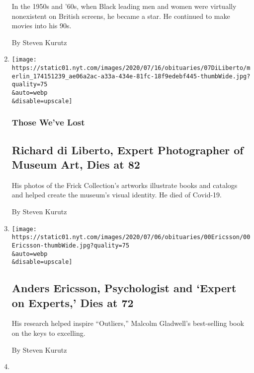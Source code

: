 \begin{enumerate}
  In the 1950s and '60s, when Black leading men and women were virtually
  nonexistent on British screens, he became a star. He continued to make
  movies into his 90s.

  By Steven Kurutz
\item
  \href{/2020/07/07/obituaries/richard-di-liberto-dead-coronavirus.html}{}

  \texttt{[image: https://static01.nyt.com/images/2020/07/16/obituaries/07DiLiberto/merlin\_174151239\_ae06a2ac-a33a-434e-81fc-18f9edebf445-thumbWide.jpg?quality=75\\\&auto=webp\\\&disable=upscale]}

  \hypertarget{those-weve-lost-2}{%
  \subsubsection{Those We've Lost}\label{those-weve-lost-2}}

  \hypertarget{richard-di-liberto-expert-photographer-of-museum-art-dies-at-82}{%
  \subsection{Richard di Liberto, Expert Photographer of Museum Art,
  Dies at
  82}\label{richard-di-liberto-expert-photographer-of-museum-art-dies-at-82}}

  His photos of the Frick Collection's artworks illustrate books and
  catalogs and helped create the museum's visual identity. He died of
  Covid-19.

  By Steven Kurutz
\item
  \href{/2020/07/01/science/anders-ericsson-dead.html}{}

  \texttt{[image: https://static01.nyt.com/images/2020/07/06/obituaries/00Ericsson/00Ericsson-thumbWide.jpg?quality=75\\\&auto=webp\\\&disable=upscale]}

  \hypertarget{anders-ericsson-psychologist-and-expert-on-experts-dies-at-72}{%
  \subsection{Anders Ericsson, Psychologist and `Expert on Experts,'
  Dies at
  72}\label{anders-ericsson-psychologist-and-expert-on-experts-dies-at-72}}

  His research helped inspire ``Outliers,'' Malcolm Gladwell's
  best-selling book on the keys to excelling.

  By Steven Kurutz
\item
  \href{/2020/06/29/business/madeline-mcwhinney-dale-dead.html}{}


\end{enumerate}
